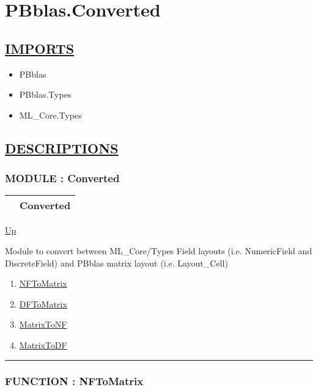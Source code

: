 \chapter*{PBblas.Converted}
\hypertarget{ecldoc:toc:PBblas.Converted}{}

\section*{\underline{IMPORTS}}
\begin{itemize}
\item PBblas
\item PBblas.Types
\item ML\_Core.Types
\end{itemize}

\section*{\underline{DESCRIPTIONS}}
\subsection*{MODULE : Converted}
\hypertarget{ecldoc:PBblas.Converted}{}

{\renewcommand{\arraystretch}{1.5}
\begin{tabularx}{\textwidth}{|>{\raggedright\arraybackslash}l|X|}
\hline
\hspace{0pt} & Converted \\
\hline
\end{tabularx}
}

\hyperlink{ecldoc:toc:PBblas}{Up}

\par
Module to convert between ML\_Core/Types Field layouts (i.e. NumericField and DiscreteField) and PBblas matrix layout (i.e. Layout\_Cell)


\begin{enumerate}
\item \hyperlink{ecldoc:pbblas.converted.nftomatrix}{NFToMatrix}
\item \hyperlink{ecldoc:pbblas.converted.dftomatrix}{DFToMatrix}
\item \hyperlink{ecldoc:pbblas.converted.matrixtonf}{MatrixToNF}
\item \hyperlink{ecldoc:pbblas.converted.matrixtodf}{MatrixToDF}
\end{enumerate}

\rule{\textwidth}{0.4pt}

\subsection*{FUNCTION : NFToMatrix}
\hypertarget{ecldoc:pbblas.converted.nftomatrix}{}

